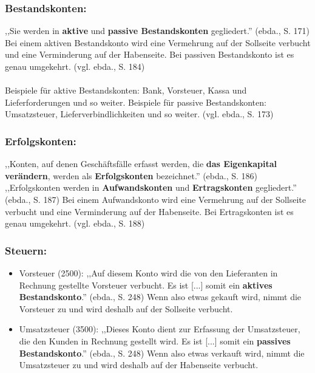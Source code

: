\documentclass[12pt]{report}
\begin{document}
\subsubsection{Bestandskonten:}
,,Sie werden in \textbf{aktive} und \textbf{passive Bestandskonten} gegliedert.'' (ebda., S. 171\nocite{RW1}) Bei einem aktiven Bestandskonto wird eine Vermehrung auf der Sollseite verbucht und eine Verminderung auf der Habenseite. Bei passiven Bestandskonto ist es genau umgekehrt. (vgl. ebda., S. 184\nocite{RW1}) \\\\
Beispiele für aktive Bestandskonten: Bank, Vorsteuer, Kassa und Lieferforderungen und so weiter.
Beispiele für passive Bestandskonten: Umsatzsteuer, Lieferverbindlichkeiten und so weiter. (vgl. ebda., S. 173\nocite{RW1})

\subsubsection{Erfolgskonten:}
,,Konten, auf denen Geschäftsfälle erfasst werden, die \textbf{das Eigenkapital verändern}, werden als \textbf{Erfolgskonten} bezeichnet.'' (ebda., S. 186\nocite{RW1})
,,Erfolgskonten werden in \textbf{Aufwandskonten} und \textbf{Ertragskonten} gegliedert.'' (ebda., S. 187\nocite{RW1})
Bei einem Aufwandskonto wird eine Vermehrung auf der Sollseite verbucht und eine Verminderung auf der Habenseite. Bei Ertragskonten ist es genau umgekehrt. (vgl. ebda., S. 188\nocite{RW1})

\subsubsection{Steuern:}
\begin{itemize}
	\item Vorsteuer (2500):
	      ,,Auf diesem Konto wird die von den Lieferanten in Rechnung gestellte Vorsteuer verbucht.
	      Es ist [...] somit ein \textbf{aktives Bestandskonto}.'' (ebda., S. 248\nocite{RW1}) Wenn also etwas gekauft wird, nimmt die Vorsteuer zu und wird deshalb auf der Sollseite verbucht.
	\item Umsatzsteuer (3500):
	      ,,Dieses Konto dient zur Erfassung der Umsatzsteuer, die den Kunden in Rechnung gestellt wird.
	      Es ist [...] somit ein \textbf{passives Bestandskonto}.'' (ebda., S. 248\nocite{RW1}) Wenn also etwas verkauft wird, nimmt die Umsatzsteuer zu und wird deshalb auf der Habenseite verbucht.
\end{itemize}
\end{document}
